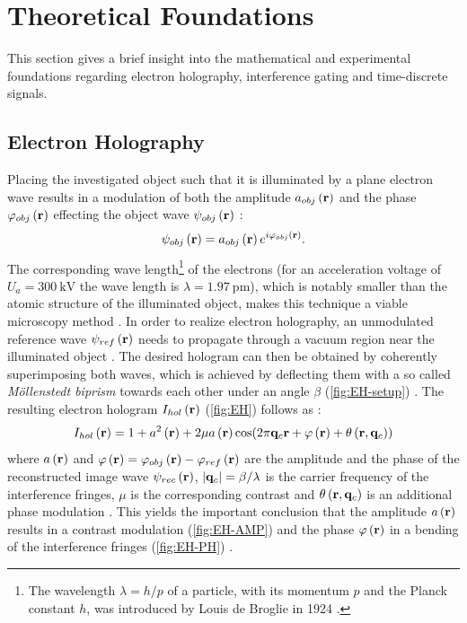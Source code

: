 \section{Theoretical Foundations} \label{sec:theoretical-foundations}
This section gives a brief insight into the mathematical and experimental foundations regarding electron holography, interference gating and time-discrete signals.
\subsection{Electron Holography} \label{ssec:electron-holography}
Placing the investigated object such that it is illuminated by a plane electron wave results in a modulation of both the amplitude $a_{obj}\left(\vb{r}\right)$ and the phase ${\varphi}_{obj}\left(\vb{r}\right)$ effecting the object wave ${\psi}_{obj}\left(\vb{r}\right)$ \cite{Lehmann2002,Lichte2007}:
\begin{equation}
	{\psi}_{obj}\left(\vb{r}\right) = a_{obj}\left(\vb{r}\right) e^{i{\varphi}_{obj}\left(\vb{r}\right)}.
\end{equation}
The corresponding wave length\footnote{The wavelength $\lambda = h/p$ of a particle, with its momentum $p$ and the Planck constant $h$, was introduced by Louis de Broglie in 1924 \cite{BrogliePhD1924}.} of the electrons (for an acceleration voltage of $U_a = \SI{300}{\kilo\volt}$ the wave length is $\lambda = \SI{1.97}{\pico\metre}$), which is notably smaller than the atomic structure of the illuminated object, makes this technique a viable microscopy method \cite{Lichte2007,Gabor1948}. In order to realize electron holography, an unmodulated reference wave ${\psi}_{ref}\left(\vb{r}\right)$ needs to propagate through a vacuum region near the illuminated object \cite{Lehmann2002,Lichte2007}. The desired hologram can then be obtained by coherently superimposing both waves, which is achieved by deflecting them with a so called \emph{Möllenstedt biprism} towards each other under an angle $\beta$ (\cref{fig:EH-setup}) \cite{Moellenstedt1956}. The resulting electron hologram $I_{hol}\left(\vb{r}\right)$ (\cref{fig:EH}) follows as \cite{Lehmann2002,Lichte2007}:
\begin{equation}
	I_{hol}\left(\vb{r}\right) = 1 + a^2\left(\vb{r}\right) + 2\mu a\left(\vb{r}\right)\cos(2\pi \vb{q}_c\vb{r} + \varphi\left(\vb{r}\right) + \theta\left(\vb{r},\vb{q}_c\right))
\end{equation}
where $a\left(\vb{r}\right)$ and $\varphi\left(\vb{r}\right) = {\varphi}_{obj}\left(\vb{r}\right) - {\varphi}_{ref}\left(\vb{r}\right)$ are the amplitude and the phase of the reconstructed image wave ${\psi}_{rec}\left(\vb{r}\right)$, $\abs{\vb{q}_c} = {\beta}/{\lambda}$ is the carrier frequency of the interference fringes, $\mu$ is the corresponding contrast \cite{Lehmann2002,Lichte2007} and $\theta\left(\vb{r}, \vb{q}_c\right)$ is an additional phase modulation \cite{LehmannPhD1997}. This yields the important conclusion that the amplitude $a\left(\vb{r}\right)$ results in a contrast modulation (\cref{fig:EH-AMP}) and the phase $\varphi\left(\vb{r}\right)$ in a bending of the interference fringes (\cref{fig:EH-PH}) \cite{Lehmann2002,Lichte2007}.
